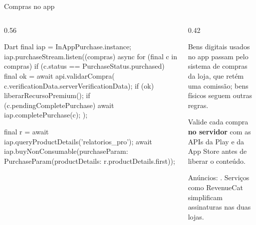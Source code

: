 \documentclass[aspectratio=169,10pt]{beamer}
\begin{document}
\begin{frame}[fragile]{Compras no app}
  \begin{columns}[T]
    \begin{column}{0.56\textwidth}
\begin{codigo}[title=in\_app\_purchase (trechos)]{Dart}
final iap = InAppPurchase.instance;
iap.purchaseStream.listen((compras) async {
  for (final c in compras) {
    if (c.status == PurchaseStatus.purchased) {
      final ok = await api.validarCompra(
          c.verificationData.serverVerificationData);
      if (ok) liberarRecursoPremium();
    }
    if (c.pendingCompletePurchase) {
      await iap.completePurchase(c);
    }
  }
});

final r = await iap.queryProductDetails({'relatorios_pro'});
await iap.buyNonConsumable(purchaseParam:
    PurchaseParam(productDetails: r.productDetails.first));
\end{codigo}
    \end{column}
    \begin{column}{0.42\textwidth}
      \begin{conceito}
        Bens digitais usados no app passam pelo sistema de compras da loja, que retém uma comissão; bens físicos seguem outras regras.
      \end{conceito}
      \begin{atencao}
        Valide cada compra \textbf{no servidor} com as APIs da Play e da App Store antes de liberar o conteúdo.
      \end{atencao}
      \begin{dica}
        Anúncios: . Serviços como RevenueCat simplificam assinaturas nas duas lojas.
      \end{dica}
    \end{column}
  \end{columns}
\end{frame}
\end{document}
